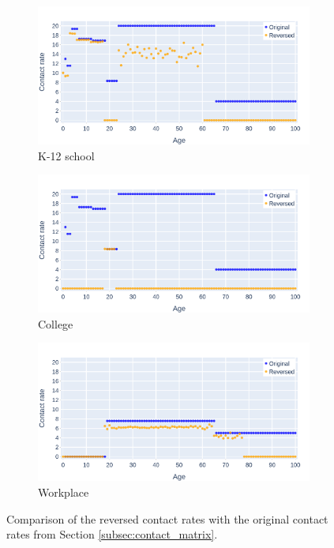 \begin{figure}
    \centering
    \begin{subfigure}{.8\linewidth}
        \centering
        \includegraphics[width=\textwidth]{4 - Sampling/fig/standard/standard_reverse_cr_k12school.png}
        \caption{K-12 school}
        \label{fig:reversed_cr_standard_k12school}
    \end{subfigure}
    \begin{subfigure}{.8\linewidth}
        \centering
        \includegraphics[width=\textwidth]{4 - Sampling/fig/standard/standard_reverse_cr_college.png}
        \caption{College}
        \label{fig:reversed_cr_standard_college}
    \end{subfigure}
    \begin{subfigure}{.8\linewidth}
        \centering
        \includegraphics[width=\textwidth]{4 - Sampling/fig/standard/standard_reverse_cr_workplace.png}
        \caption{Workplace}
        \label{fig:reversed_cr_standard_workplace}
    \end{subfigure}
    \caption{Comparison of the reversed contact rates with the original contact rates from Section \ref{subsec:contact_matrix}.}
\end{figure}
